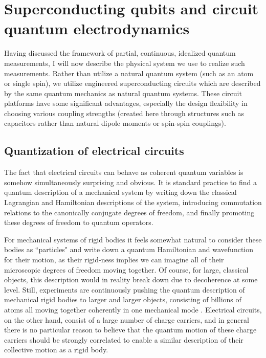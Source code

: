 
\chapter{Superconducting qubits and circuit quantum electrodynamics}
\label{c:scqb}

Having discussed the framework of partial, continuous, idealized quantum measurements, I will now describe the physical system we use to realize such measurements.  Rather than utilize a natural quantum system (such as an atom or single spin), we utilize engineered superconducting circuits which are described by the same quantum mechanics as natural quantum systems.  These circuit platforms have some significant advantages, especially the design flexibility in choosing various coupling strengths (created here through structures such as capacitors rather than natural dipole moments or spin-spin couplings).

\section{Quantization of electrical circuits}

The fact that electrical circuits can behave as coherent quantum variables is somehow simultaneously surprising and obvious.  It is standard practice to find a quantum description of a mechanical system by writing down the classical Lagrangian and Hamiltonian descriptions of the system, introducing commutation relations to the canonically conjugate degrees of freedom, and finally promoting these degrees of freedom to quantum operators.

For mechanical systems of rigid bodies it feels somewhat natural to consider these bodies as ``particles" and write down a quantum Hamiltonian and wavefunction for their motion, as their rigid-ness implies we can imagine all of their microscopic degrees of freedom moving together.  Of course, for large, classical objects, this description would in reality break down due to decoherence at some level. Still, experiments are continuously pushing the quantum description of mechanical rigid bodies to larger and larger objects, consisting of billions of atoms all moving together coherently in one mechanical mode \cite{Rocheleau2010,OConnell2010,Palomaki2013}.  Electrical circuits, on the other hand, consist of a large number of charge carriers, and in general there is no particular reason to believe that the quantum motion of these charge carriers should be strongly correlated to enable a similar description of their collective motion as a rigid body.

